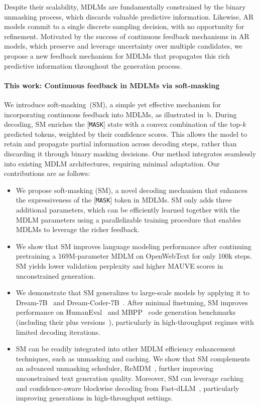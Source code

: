 \documentclass{article}
\newcommand{\mask}{[\texttt{MASK}]\xspace}
\begin{document}
Despite their scalability, MDLMs are fundamentally constrained by the binary unmasking process, which discards valuable predictive information. 
%
Likewise, AR models commit to a single discrete sampling decision, with no opportunity for refinement. 
%
Motivated by the success of continuous feedback mechanisms in AR models, which preserve and leverage uncertainty over multiple candidates, we propose a new feedback mechanism for MDLMs that propagates this rich predictive information throughout the generation process.


\paragraph{This work: Continuous feedback in MDLMs via soft-masking}
We introduce soft-masking~(SM), a simple yet effective mechanism for incorporating continuous feedback into MDLMs, as illustrated in~b.
%
During decoding, SM enriches the \mask state with a convex combination of the top-$k$ predicted tokens, weighted by their confidence scores.
%
This allows the model to retain and propagate partial information across decoding steps, rather than discarding it through binary masking decisions.
%
Our method integrates seamlessly into existing MDLM architectures, requiring minimal adaptation.
%
Our contributions are as follows: 
\begin{itemize}[itemsep=-0.0em, topsep=-0.1em]
\item We propose soft-masking (SM), a novel decoding mechanism that enhances the expressiveness of the \mask token in MDLMs. SM only adds three additional parameters, which can be efficiently learned together with the MDLM parameters using a parallelizable training procedure that enables MDLMs to leverage the richer feedback.
\item We show that SM improves language modeling performance after continuing pretraining a 169M-parameter MDLM on OpenWebText for only 100k steps. SM yields lower validation perplexity and higher MAUVE scores in unconstrained generation. 
\item We demonstrate that SM generalizes to large-scale models by applying it to Dream-7B~\citep{ye_dream_2025} and Dream-Coder-7B~\citep{xie_dream-coder_2025}. 
After minimal finetuning, SM improves performance on HumanEval~\citep{chen_evaluating_2021} and MBPP~\citep{mbpp_2021} code generation benchmarks (including their plus versions~\citep{evalplus_2023}), particularly in high-throughput regimes with limited decoding iterations.
\item SM can be readily integrated into other MDLM efficiency enhancement techniques, such as unmasking and caching. We show that SM complements an advanced unmasking scheduler, ReMDM~\citep{wang_remasking_2025}, further improving unconstrained text generation quality. 
Moreover, SM can leverage caching and confidence-aware blockwise decoding from Fast-dLLM~\citep{wu_fast-dllm_2025}, particularly improving generations in high-throughput settings.  
\end{itemize}
\end{document}
